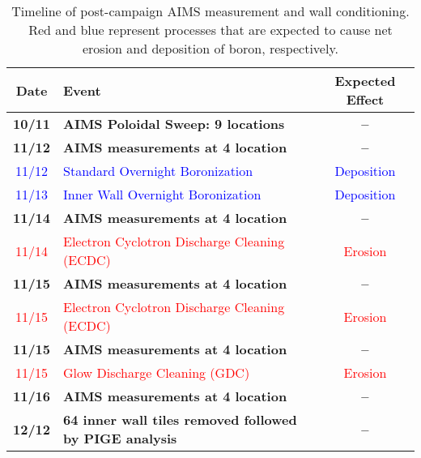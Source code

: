\documentclass[final,3p,times,twocolumn]{elsarticle}
\begin{document}
%
\begin{table}
 \centering
 \begin{tabular}{|c|l|c|}
  \hline
  Date & Event & Expected Effect\\ \hline \hline 
  \textbf{10/11} & \textbf{AIMS Poloidal Sweep: 9 locations} & \textbf{--}\\ \hline
  \textbf{11/12} & \textbf{AIMS measurements at 4 location} & \textbf{--}\\ \hline
  \textcolor{blue}{11/12} & \textcolor{blue}{Standard Overnight Boronization} & \textcolor{blue}{Deposition} \\ \hline
  \textcolor{blue}{11/13} & \textcolor{blue}{Inner Wall Overnight Boronization} & \textcolor{blue}{Deposition} \\ \hline
  \textbf{11/14} & \textbf{AIMS measurements at 4 location} & \textbf{--}\\ \hline
  \textcolor{red}{11/14} & \textcolor{red}{Electron Cyclotron Discharge Cleaning (ECDC)} & \textcolor{red}{Erosion} \\ \hline
  \textbf{11/15} & \textbf{AIMS measurements at 4 location} & \textbf{--}\\ \hline
  \textcolor{red}{11/15} & \textcolor{red}{Electron Cyclotron Discharge Cleaning (ECDC)} & \textcolor{red}{Erosion} \\ \hline
  \textbf{11/15} & \textbf{AIMS measurements at 4 location} & \textbf{--}\\ \hline
  \textcolor{red}{11/15} & \textcolor{red}{Glow Discharge Cleaning (GDC)} & \textcolor{red}{Erosion} \\ \hline
  \textbf{11/16} & \textbf{AIMS measurements at 4 location} & \textbf{--}\\ \hline
  \textbf{12/12} & \textbf{64 inner wall tiles removed followed by PIGE analysis} & \textbf{--}\\ \hline
 \end{tabular}
 \caption{Timeline of post-campaign AIMS measurement and wall conditioning. Red and blue represent processes that are expected to cause net erosion and deposition of boron, respectively.}
 \label{tab:PostCampaignTimeline}
\end{table}

\end{document}
